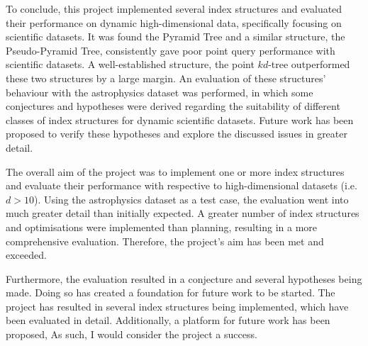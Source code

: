 To conclude, this project implemented several index structures and evaluated their performance on dynamic high-dimensional data, specifically focusing on scientific datasets. It was found the Pyramid Tree and a similar structure, the Pseudo-Pyramid Tree, consistently gave poor point query performance with scientific datasets. A well-established structure, the point $kd$-tree outperformed these two structures by a large margin. An evaluation of these structures' behaviour with the astrophysics dataset was performed, in which some conjectures and hypotheses were derived regarding the suitability of different classes of index structures for dynamic scientific datasets. Future work has been proposed to verify these hypotheses and explore the discussed issues in greater detail.

The overall aim of the project was to implement one or more index structures and evaluate their performance with respective to high-dimensional datasets (i.e. $d > 10$). Using the astrophysics dataset as a test case, the evaluation went into much greater detail than initially expected. A greater number of index structures and optimisations were implemented than planning, resulting in a more comprehensive evaluation. Therefore, the project's aim has been met and exceeded.

Furthermore, the evaluation resulted in a conjecture and several hypotheses being made. Doing so has created a foundation for future work to be started. The project has resulted in several index structures being implemented, which have been evaluated in detail. Additionally, a platform for future work has been proposed, As such, I would consider the project a success.